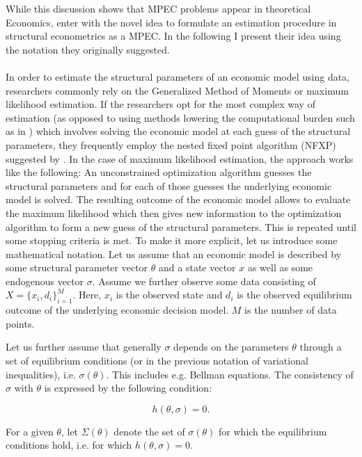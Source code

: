 While this discussion shows that MPEC problems appear in theoretical Economics, \cite{Su.Judd.2012} enter with the novel idea to formulate an estimation procedure in structural econometrics as a MPEC. In the following I present their idea using the notation they originally suggested. 

\paragraph{}
In order to estimate the structural parameters of an economic model using data, researchers commonly rely on the Generalized Method of Moments or maximum likelihood estimation. If the researchers opt for the most complex way of estimation (as opposed to using methods lowering the computational burden such as in \cite{Hotz.Miller.1993}) which involves solving the economic model at each guess of the structural parameters, they frequently employ the nested fixed point algorithm (NFXP) suggested by \cite{Rust.1987}. In the case of maximum likelihood estimation, the approach works like the following: An unconstrained optimization algorithm guesses the structural parameters and for each of those guesses the underlying economic model is solved. The resulting outcome of the economic model allows to evaluate the maximum likelihood which then gives new information to the optimization algorithm to form a new guess of the structural parameters. This is repeated until some stopping criteria is met. To make it more explicit, let us introduce some mathematical notation. Let us assume that an economic model is described by some structural parameter vector $\theta$ and a state vector $x$ as well as some endogenous vector $\sigma$. Assume we further observe some data consisting of $X = \{x_i, d_i\}^M_{i=1}$. Here, $x_i$ is the observed state and $d_i$ is the observed equilibrium outcome of the underlying economic decision model. $M$ is the number of data points.

Let us further assume that generally $\sigma$ depends on the parameters $\theta$ through a set of equilibrium conditions (or in the previous notation of variational inequalities), i.e. $\sigma(\theta)$. This includes e.g. Bellman equations. The consistency of $\sigma$ with $\theta$ is expressed by the following condition: 

\begin{equation*}
h(\theta, \sigma) = 0.
\end{equation*}

For a given $\theta$, let $\Sigma(\theta)$ denote the set of $\sigma(\theta)$ for which the equilibrium conditions hold, i.e. for which $h(\theta,\sigma)=0$. 

